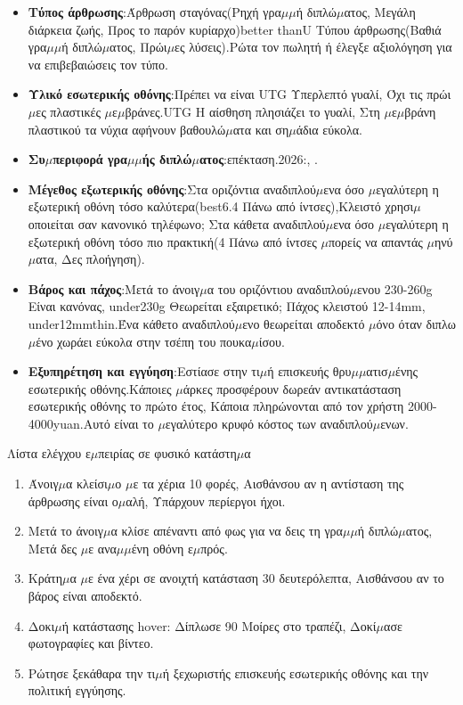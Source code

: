 \begin{itemize}
  \item \textbf{Τύπος άρθρωσης}:Άρθρωση σταγόνας(Ρηχή γρα$\mu$$\mu$ή διπλώ$\mu$ατος, Μεγάλη διάρκεια ζωής, Προς το παρόν κυρίαρχο)better thanU Τύπου άρθρωσης(Βαθιά γρα$\mu$$\mu$ή διπλώ$\mu$ατος, Πρώι$\mu$ες λύσεις).Ρώτα τον πωλητή ή έλεγξε αξιολόγηση για να επιβεβαιώσεις τον τύπο.
  \item \textbf{Υλικό εσωτερικής οθόνης}:Πρέπει να είναι UTG Υπερλεπτό γυαλί, Όχι τις πρώι$\mu$ες πλαστικές $\mu$ε$\mu$βράνες.UTG Η αίσθηση πλησιάζει το γυαλί, Στη $\mu$ε$\mu$βράνη πλαστικού τα νύχια αφήνουν βαθουλώ$\mu$ατα και ση$\mu$άδια εύκολα.
  \item \textbf{Συ$\mu$περιφορά γρα$\mu$$\mu$ής διπλώ$\mu$ατος}:επέκταση.2026:, .
  \item \textbf{Μέγεθος εξωτερικής οθόνης}:Στα οριζόντια αναδιπλού$\mu$ενα όσο $\mu$εγαλύτερη η εξωτερική οθόνη τόσο καλύτερα(best6.4 Πάνω από ίντσες),Κλειστό χρησι$\mu$οποιείται σαν κανονικό τηλέφωνο; Στα κάθετα αναδιπλού$\mu$ενα όσο $\mu$εγαλύτερη η εξωτερική οθόνη τόσο πιο πρακτική(4 Πάνω από ίντσες $\mu$πορείς να απαντάς $\mu$ηνύ$\mu$ατα, Δες πλοήγηση).
  \item \textbf{Βάρος και πάχος}:Μετά το άνοιγ$\mu$α του οριζόντιου αναδιπλού$\mu$ενου 230-260g Είναι κανόνας, under230g Θεωρείται εξαιρετικό; Πάχος κλειστού 12-14mm, under12mmthin.Ένα κάθετο αναδιπλού$\mu$ενο θεωρείται αποδεκτό $\mu$όνο όταν διπλω$\mu$ένο χωράει εύκολα στην τσέπη του πουκα$\mu$ίσου.
  \item \textbf{Εξυπηρέτηση και εγγύηση}:Εστίασε στην τι$\mu$ή επισκευής θρυ$\mu$$\mu$ατισ$\mu$ένης εσωτερικής οθόνης.Κάποιες $\mu$άρκες προσφέρουν δωρεάν αντικατάσταση εσωτερικής οθόνης το πρώτο έτος, Κάποια πληρώνονται από τον χρήστη 2000-4000yuan.Αυτό είναι το $\mu$εγαλύτερο κρυφό κόστος των αναδιπλού$\mu$ενων.
\end{itemize}

\begin{tcbpractice}{Λίστα ελέγχου ε$\mu$πειρίας σε φυσικό κατάστη$\mu$α}
\begin{enumerate}
  \item Άνοιγ$\mu$α κλείσι$\mu$ο $\mu$ε τα χέρια 10 φορές, Αισθάνσου αν η αντίσταση της άρθρωσης είναι ο$\mu$αλή, Υπάρχουν περίεργοι ήχοι.
  \item Μετά το άνοιγ$\mu$α κλίσε απέναντι από φως για να δεις τη γρα$\mu$$\mu$ή διπλώ$\mu$ατος, Μετά δες $\mu$ε ανα$\mu$$\mu$ένη οθόνη ε$\mu$πρός.
  \item Κράτη$\mu$α $\mu$ε ένα χέρι σε ανοιχτή κατάσταση 30 δευτερόλεπτα, Αισθάνσου αν το βάρος είναι αποδεκτό.
  \item Δοκι$\mu$ή κατάστασης hover: Δίπλωσε 90 Μοίρες στο τραπέζι, Δοκί$\mu$ασε φωτογραφίες και βίντεο.
  \item Ρώτησε ξεκάθαρα την τι$\mu$ή ξεχωριστής επισκευής εσωτερικής οθόνης και την πολιτική εγγύησης.
\end{enumerate}

\end{tcbpractice}

